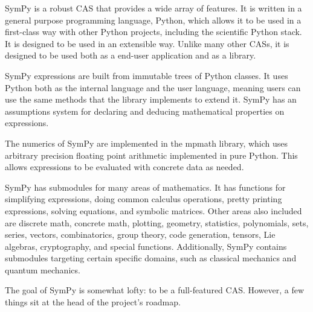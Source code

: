 SymPy is a robust CAS that provides a wide array of features. It is written in
a general purpose programming language, Python, which allows it to be used in
a first-class way with other Python projects, including the scientific Python
stack. It is designed to be used in an extensible way. Unlike many other CASs,
it is designed to be used both as a end-user application and as a library.

SymPy expressions are built from immutable trees of Python classes. It uses
Python both as the internal language and the user language, meaning users can
use the same methods that the library implements to extend it. SymPy has an
assumptions system for declaring and deducing mathematical properties on
expressions.

The numerics of SymPy are implemented in the mpmath library, which uses
arbitrary precision floating point arithmetic implemented in pure Python. This
allows expressions to be evaluated with concrete data as needed.

SymPy has submodules for many areas of mathematics. It has functions for
simplifying expressions, doing common calculus operations, pretty printing
expressions, solving equations, and symbolic matrices. Other areas also
included are discrete math, concrete math, plotting, geometry, statistics,
polynomials, sets, series, vectors, combinatorics, group theory, code
generation, tensors, Lie algebras, cryptography, and special functions.
Additionally, SymPy contains submodules targeting certain specific domains,
such as classical mechanics and quantum mechanics.

The goal of SymPy is somewhat lofty: to be a full-featured CAS\@. However, a
few things sit at the head of the project's roadmap.


%
